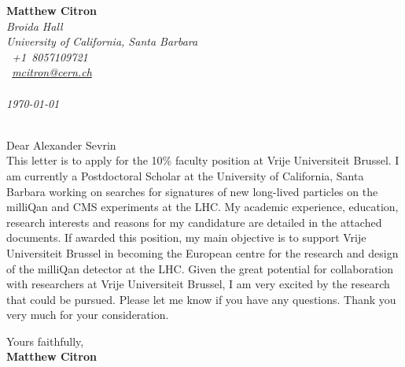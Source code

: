 \documentclass[12pt]{article}
\begin{document}
\sffamily   %
\hfill%
\begin{minipage}[t]{.6\textwidth}
\raggedleft%
{\bfseries Matthew Citron}\\[.35ex]
\small\itshape%
Broida Hall\\ University of California, Santa Barbara\\
\Telefon~+1~8057109721\\
\Letter~\href{mailto:mcitron@cern.ch}{mcitron@cern.ch}\\~\\

\today
\end{minipage}\\[1em]
%
\hfill %
Dear Alexander Sevrin\\[1.5em]
%
This letter is to apply for the 10\% faculty position at Vrije Universiteit Brussel. I am currently a Postdoctoral
Scholar at the University of California, Santa Barbara working on searches for signatures of 
new long-lived particles on the milliQan and CMS experiments at the LHC.
My academic experience, education, research interests and reasons for my candidature are
detailed in the attached documents. If awarded this position, my main objective is to
support Vrije Universiteit Brussel in becoming the European centre for 
the research and design of the milliQan detector at the LHC. Given the great potential 
for collaboration with researchers at Vrije Universiteit Brussel, I am very excited by the
research that could be pursued. Please let me know if you have any questions. 
Thank you very much for your consideration.

Yours faithfully,\\[2em] %
%
{\bfseries Matthew Citron}\\
%
\vfill%
\end{document}
